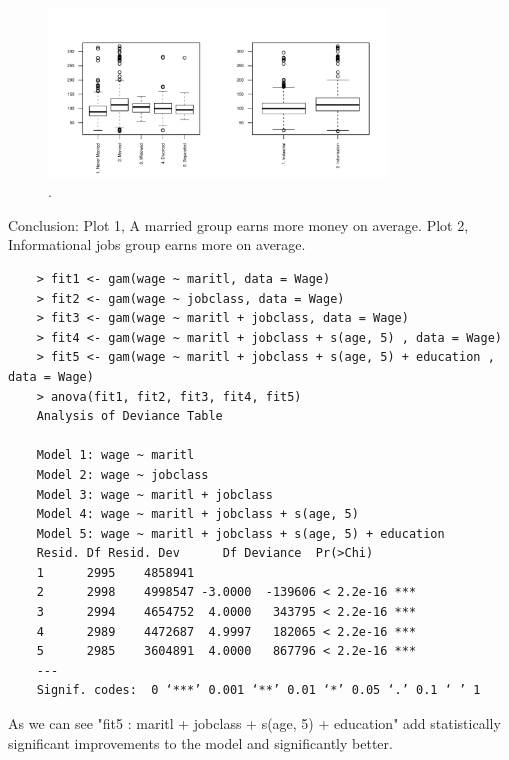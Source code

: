 \documentclass{article}
\begin{document}
\begin{figure}[htb]
	\begin{center}
		\includegraphics[width=0.8\textwidth]{MTH522_hw6_p2_1.pdf}
	\end{center}
	\caption{.}
	\label{fig:MTH522_hw6_p2_1}
\end{figure}

Conclusion: Plot 1, A married group earns more money on average. Plot 2, Informational jobs group earns more on average.




\newpage

\begin{program}
	\begin{verbatim}
	> fit1 <- gam(wage ~ maritl, data = Wage)
	> fit2 <- gam(wage ~ jobclass, data = Wage)
	> fit3 <- gam(wage ~ maritl + jobclass, data = Wage)
	> fit4 <- gam(wage ~ maritl + jobclass + s(age, 5) , data = Wage)
	> fit5 <- gam(wage ~ maritl + jobclass + s(age, 5) + education , data = Wage)
	> anova(fit1, fit2, fit3, fit4, fit5)
	Analysis of Deviance Table
	
	Model 1: wage ~ maritl
	Model 2: wage ~ jobclass
	Model 3: wage ~ maritl + jobclass
	Model 4: wage ~ maritl + jobclass + s(age, 5)
	Model 5: wage ~ maritl + jobclass + s(age, 5) + education
	Resid. Df Resid. Dev      Df Deviance  Pr(>Chi)    
	1      2995    4858941                               
	2      2998    4998547 -3.0000  -139606 < 2.2e-16 ***
	3      2994    4654752  4.0000   343795 < 2.2e-16 ***
	4      2989    4472687  4.9997   182065 < 2.2e-16 ***
	5      2985    3604891  4.0000   867796 < 2.2e-16 ***
	---
	Signif. codes:  0 ‘***’ 0.001 ‘**’ 0.01 ‘*’ 0.05 ‘.’ 0.1 ‘ ’ 1	
	\end{verbatim}
\end{program}

As we can see "fit5 : maritl + jobclass + s(age, 5) + education" add statistically significant improvements to the model and significantly better.
\end{document}
